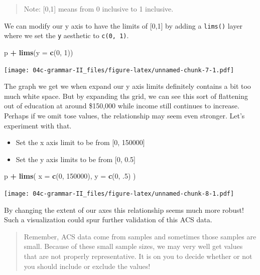 \documentclass[
]{book}
\newenvironment{Shaded}{\begin{snugshade}}{\end{snugshade}}
\newcommand{\DataTypeTok}[1]{\textcolor[rgb]{0.13,0.29,0.53}{#1}}
\newcommand{\DecValTok}[1]{\textcolor[rgb]{0.00,0.00,0.81}{#1}}
\newcommand{\FloatTok}[1]{\textcolor[rgb]{0.00,0.00,0.81}{#1}}
\newcommand{\KeywordTok}[1]{\textcolor[rgb]{0.13,0.29,0.53}{\textbf{#1}}}
\newcommand{\NormalTok}[1]{#1}
\newcommand{\OperatorTok}[1]{\textcolor[rgb]{0.81,0.36,0.00}{\textbf{#1}}}
\newcommand{\StringTok}[1]{\textcolor[rgb]{0.31,0.60,0.02}{#1}}
\providecommand{\tightlist}{%
  \setlength{\itemsep}{0pt}\setlength{\parskip}{0pt}}
\begin{document}
\begin{quote}
Note: {[}0,1{]} means from 0 inclusive to 1 inclusive.
\end{quote}

We can modify our y axis to have the limits of {[}0,1{]} by adding a \texttt{lims()} layer where we set the \texttt{y} aesthetic to \texttt{c(0,\ 1)}.

\begin{Shaded}
\begin{Highlighting}[]
\NormalTok{p }\OperatorTok{+}
\StringTok{  }\KeywordTok{lims}\NormalTok{(}\DataTypeTok{y =} \KeywordTok{c}\NormalTok{(}\DecValTok{0}\NormalTok{, }\DecValTok{1}\NormalTok{))}
\end{Highlighting}
\end{Shaded}

\texttt{[image: 04c-grammar-II\_files/figure-latex/unnamed-chunk-7-1.pdf]}

The graph we get we when expand our y axis limits definitely contains a bit too much white space. But by expanding ths grid, we can see this sort of flattening out of education at around \$150,000 while income still continues to increase. Perhaps if we omit tose values, the relationship may seem even stronger. Let's experiment with that.

\begin{itemize}
\tightlist
\item
  Set the x axis limit to be from {[}0, 150000{]}
\item
  Set the y axis limits to be from {[}0, 0.5{]}
\end{itemize}

\begin{Shaded}
\begin{Highlighting}[]
\NormalTok{p }\OperatorTok{+}
\StringTok{  }\KeywordTok{lims}\NormalTok{(}
    \DataTypeTok{x =} \KeywordTok{c}\NormalTok{(}\DecValTok{0}\NormalTok{, }\DecValTok{150000}\NormalTok{),}
    \DataTypeTok{y =} \KeywordTok{c}\NormalTok{(}\DecValTok{0}\NormalTok{, }\FloatTok{.5}\NormalTok{)}
\NormalTok{    )}
\end{Highlighting}
\end{Shaded}

\texttt{[image: 04c-grammar-II\_files/figure-latex/unnamed-chunk-8-1.pdf]}

By changing the extent of our axes this relationship seems much more robust! Such a visualization could spur further validation of this ACS data.

\begin{quote}
Remember, ACS data come from samples and sometimes those samples are small. Because of these small sample sizes, we may very well get values that are not properly representative. It is on you to decide whether or not you should include or exclude the values!
\end{quote}
\end{document}
